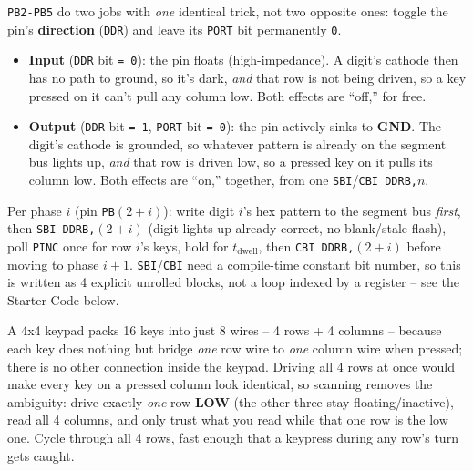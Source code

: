 \documentclass[11pt]{article}
\begin{document}
\begin{summary}
\texttt{PB2-PB5} do two jobs with \emph{one} identical trick, not two opposite
ones: toggle the pin's \textbf{direction} (\texttt{DDR}) and leave its
\texttt{PORT} bit permanently \texttt{0}.
\begin{itemize}[nosep,leftmargin=*]
  \item \textbf{Input} (\texttt{DDR} bit \texttt{= 0}): the pin floats
        (high-impedance). A digit's cathode then has no path to ground, so it's
        dark, \emph{and} that row is not being driven, so a key pressed on it
        can't pull any column low. Both effects are ``off,'' for free.
  \item \textbf{Output} (\texttt{DDR} bit \texttt{= 1}, \texttt{PORT} bit
        \texttt{= 0}): the pin actively sinks to \textbf{GND}. The digit's
        cathode is grounded, so whatever pattern is already on the segment bus
        lights up, \emph{and} that row is driven low, so a pressed key on it
        pulls its column low. Both effects are ``on,'' together, from one
        \texttt{SBI}/\texttt{CBI DDRB,}$n$.
\end{itemize}
Per phase $i$ (pin \texttt{PB}$(2{+}i)$): write digit $i$'s hex pattern to the
segment bus \emph{first}, then \texttt{SBI DDRB,}$(2{+}i)$ (digit lights up
already correct, no blank/stale flash), poll \texttt{PINC} once for row $i$'s
keys, hold for $t_{\text{dwell}}$, then \texttt{CBI DDRB,}$(2{+}i)$ before moving
to phase $i{+}1$. \texttt{SBI}/\texttt{CBI} need a compile-time constant bit
number, so this is written as 4 explicit unrolled blocks, not a loop indexed by
a register -- see the Starter Code below.
\end{summary}

\begin{summary}
A 4x4 keypad packs 16 keys into just 8 wires -- 4 rows + 4 columns -- because each
key does nothing but bridge \emph{one} row wire to \emph{one} column wire when
pressed; there is no other connection inside the keypad. Driving all 4 rows at once
would make every key on a pressed column look identical, so scanning removes the
ambiguity: drive exactly \emph{one} row \textbf{LOW} (the other three stay
floating/inactive), read all 4 columns, and only trust what you read while that
one row is the low one. Cycle through all 4 rows, fast enough that a keypress
during any row's turn gets caught.
\end{summary}
\end{document}
